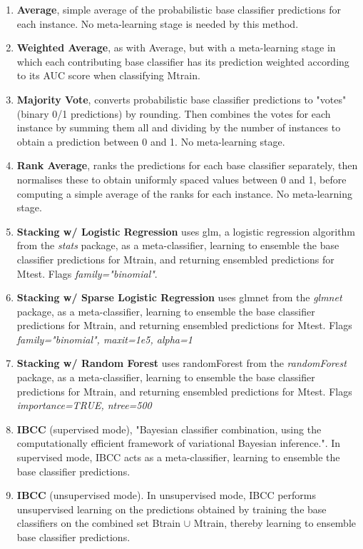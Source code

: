 \documentclass{document}
\begin{document}
\begin{enumerate}
    \item \textbf{Average}, simple average of the probabilistic base classifier predictions for each instance. No meta-learning stage is needed by this method.
    \item \textbf{Weighted Average}, as with Average, but with a meta-learning stage in which each contributing base classifier has its prediction weighted according to its AUC score when classifying Mtrain.
    \item \textbf{Majority Vote}, converts probabilistic base classifier predictions to "votes" (binary 0/1 predictions) by rounding. Then combines the votes for each instance by summing them all and dividing by the number of instances to obtain a prediction between 0 and 1. No meta-learning stage.
    \item \textbf{Rank Average}, ranks the predictions for each base classifier separately, then normalises these to obtain uniformly spaced values between 0 and 1, before computing a simple average of the ranks for each instance. No meta-learning stage.
    \item \textbf{Stacking w/ Logistic Regression} uses glm, a logistic regression algorithm from the \textit{stats} package, as a meta-classifier, learning to ensemble the base classifier predictions for Mtrain, and returning ensembled predictions for Mtest. Flags \textit{family="binomial"}.
    \item \textbf{Stacking w/ Sparse Logistic Regression} uses glmnet from the \textit{glmnet} package, as a meta-classifier, learning to ensemble the base classifier predictions for Mtrain, and returning ensembled predictions for Mtest. Flags \textit{family="binomial", maxit=1e5, alpha=1}
    \item \textbf{Stacking w/ Random Forest} uses randomForest from the \textit{randomForest} package, as a meta-classifier, learning to ensemble the base classifier predictions for Mtrain, and returning ensembled predictions for Mtest. Flags \textit{importance=TRUE, ntree=500}
    \item \textbf{IBCC} (supervised mode), "Bayesian classifier combination, using the computationally efficient framework of variational Bayesian inference."\cite{Simpson13}. In supervised mode, IBCC acts as a meta-classifier, learning to ensemble the base classifier predictions.
    \item \textbf{IBCC} (unsupervised mode). In unsupervised mode, IBCC performs unsupervised learning on the predictions obtained by training the base classifiers on the combined set Btrain $\cup$ Mtrain, thereby learning to ensemble base classifier predictions.
\end{enumerate}
\end{document}
